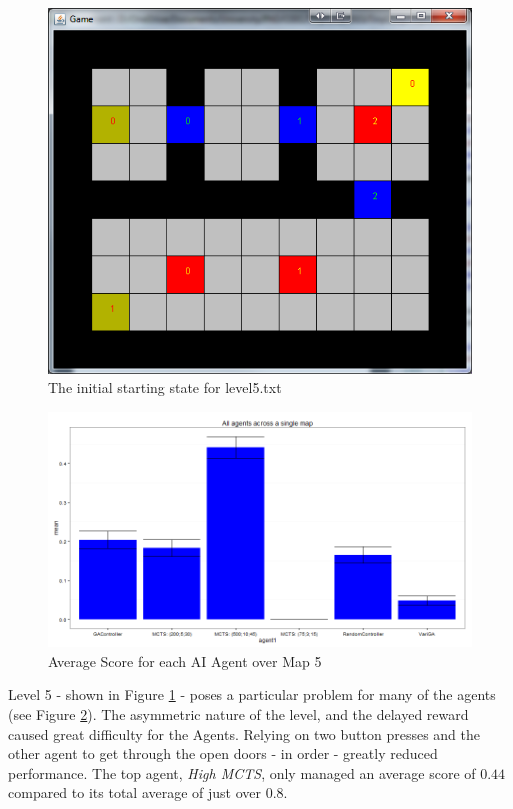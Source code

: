 \documentclass{IEEEtran}
\begin{document}
\pagebreak
\begin{figure}[ht]
\centering
\includegraphics[scale=0.5]{level5}
\caption{The initial starting state for level5.txt}
\label{Level5State}
\end{figure}

\begin{figure}[ht]
\centering
\includegraphics[width = \linewidth]{level5-txt-scores}
\caption{Average Score for each AI Agent over Map 5}
\label{avgScoreMap5}
\end{figure}

Level 5 - shown in Figure \ref{Level5State} - poses a particular problem for many of the agents (see Figure \ref{avgScoreMap5}). The asymmetric nature of the level, and the delayed reward caused great difficulty for the Agents. Relying on two button presses and the other agent to get through the open doors - in order - greatly reduced performance. The top agent, \emph{High MCTS}, only managed an average score of $0.44$ compared to its total average of just over $0.8$.
\end{document}
